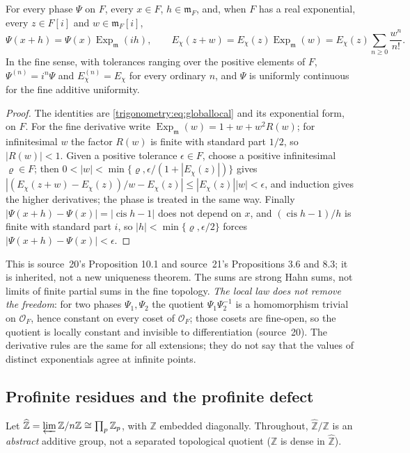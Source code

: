 \documentclass[11pt,letterpaper]{article}
\numberwithin{equation}{section}
\theoremstyle{definition}
\theoremstyle{remark}
\newcommand{\Z}{\mathbb Z}
\newcommand{\OO}{\mathcal O}
\newcommand{\mm}{\mathfrak m}
\newcommand{\cis}{\operatorname{cis}}
\newcommand{\Ex}{\operatorname{Exp}_{\mm}}
\newcommand{\Zhat}{\widehat{\Z}}
\begin{document}
\begin{proposition}\label{trigonometry:per:prop:local}
For every phase $\Psi$ on $F$, every $x\in F$, $h\in\mm_F$, and, when $F$ has a real exponential,
every $z\in F[i]$ and $w\in\mm_F[i]$,
\[
 \Psi(x+h)=\Psi(x)\Ex(ih),\qquad E_\chi(z+w)=E_\chi(z)\Ex(w)=E_\chi(z)\sum_{n\ge0}\frac{w^n}{n!}.
\]
In the fine sense, with tolerances ranging over the positive elements of $F$,
$\Psi^{(n)}=i^n\Psi$ and $E_\chi^{(n)}=E_\chi$ for every ordinary $n$, and $\Psi$ is uniformly
continuous for the fine additive uniformity.
\end{proposition}
\begin{proof}
The identities are \cref{trigonometry:eq:globallocal} and its exponential form, on $F$. For the fine
derivative write $\Ex(w)=1+w+w^2R(w)$; for infinitesimal $w$ the factor $R(w)$ is finite with
standard part $1/2$, so $|R(w)|<1$. Given a positive tolerance $\epsilon\in F$, choose a positive
infinitesimal $\varrho\in F$; then
$0<|w|<\min\{\varrho,\epsilon/(1+|E_\chi(z)|)\}$ gives $|(E_\chi(z+w)-E_\chi(z))/w-E_\chi(z)|\le|E_\chi(z)||w|<\epsilon$, and induction
gives the higher derivatives; the phase is treated in the same way. Finally
$|\Psi(x+h)-\Psi(x)|=|\cis h-1|$ does not depend on $x$, and $(\cis h-1)/h$ is finite with standard
part $i$, so $|h|<\min\{\varrho,\epsilon/2\}$ forces $|\Psi(x+h)-\Psi(x)|<\epsilon$.
\end{proof}
This is source~20's Proposition 10.1 and source~21's Propositions 3.6 and 8.3; it is inherited, not a
new uniqueness theorem. The sums are strong Hahn sums, not limits of finite partial sums in the fine
topology. \emph{The local law does not remove the freedom}: for two phases $\Psi_1,\Psi_2$ the
quotient $\Psi_1\Psi_2^{-1}$ is a homomorphism trivial on $\OO_F$, hence constant on every coset of
$\OO_F$; those cosets are fine-open, so the quotient is locally constant and invisible to
differentiation (source~20). The derivative rules are the same for all extensions; they do not say
that the values of distinct exponentials agree at infinite points.

\subsection{Profinite residues and the profinite defect}\label{trigonometry:per:sec:defect}
Let $\Zhat=\varprojlim\Z/n\Z\cong\prod_p\Z_p$, with $\Z$ embedded diagonally. Throughout,
$\Zhat/\Z$ is an \emph{abstract} additive group, not a separated topological quotient ($\Z$ is dense
in $\Zhat$).
\end{document}
